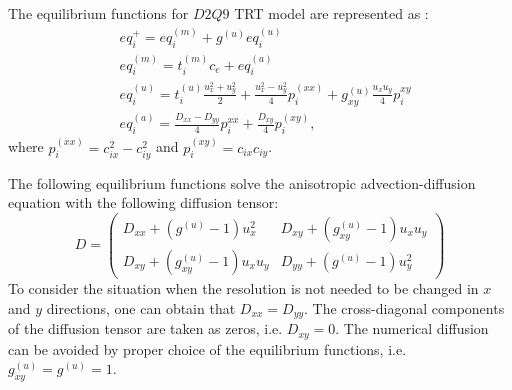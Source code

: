 \documentclass{article}
\begin{document}
The equilibrium functions for $D2Q9$ TRT model are represented as \cite{kuzmin-stability-optimal}:
\begin{equation}
\begin{aligned}
&eq_i^{+}=eq_i^{(m)}+g^{(u)} eq_i^{(u)}\\
&eq_i^{(m)}=t_i^{(m)} c_e+ eq_i^{(a)}\\
&eq_i^{(u)}=t_i^{(u)} \frac{u_x^2+u_y^2}{2}+\frac{u_x^2-u_y^2}{4} p_i^{(xx)}+g_{xy}^{(u)}\frac{u_x
u_y}{4} p_i^{xy}\\
&eq_i^{(a)}=\frac{D_{xx}-D_{yy}}{4} p_i^{xx}+\frac{D_{xy}}{4} p_i^{(xy)},
\end{aligned}
\end{equation}
where $p_i^{(xx)}=c_{ix}^2-c_{iy}^2$ and $p_i^{(xy)}=c_{ix} c_{iy}$. 

The following equilibrium functions solve the anisotropic advection-diffusion equation with the
following diffusion tensor:
\begin{equation}
D=
\begin{pmatrix}
D_{xx} + (g^{(u)}-1) u_x^2 & D_{xy}+(g_{xy}^{(u)}-1)u_x u_y\\
D_{xy} + (g_{xy}^{(u)}-1) u_x u_y& D_{yy}+(g^{(u)}-1) u_y^2 
\end{pmatrix}
\end{equation}
To consider the situation when the resolution is not needed to be changed in $x$ and $y$
directions, one can obtain that $D_{xx}=D_{yy}$. The cross-diagonal components of the diffusion
tensor are taken as zeros, i.e. $D_{xy}=0$. The numerical diffusion can be avoided by proper choice
of the equilibrium functions, i.e. $g_{xy}^{(u)}=g^{(u)}=1$.
\end{document}
